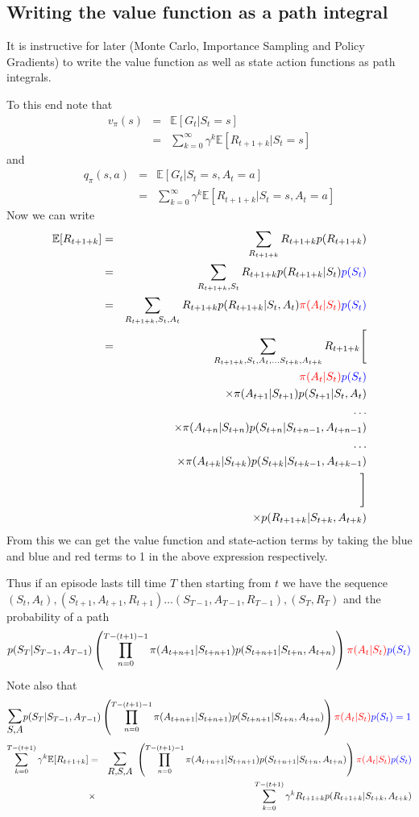 \documentclass[11pt,a4paper]{article}
\newcommand\bea{\begin{eqnarray}}
\newcommand\eea{\end{eqnarray}}
\newcommand{\nn}{\nonumber \\}
\newcommand{\e}[1]{\mathbb E[#1]}
\begin{document}
\subsection{Writing the value function as a path integral} \label{Section:PathIntegral}

It is instructive for later (Monte Carlo, Importance Sampling and Policy Gradients) to write the value function as well as state action functions as path integrals.

To this end note that
\bea
v_\pi(s) &=& \e{G_t|S_t=s} \nn
&=& \sum_{k=0}^\infty \gamma^k \e{R_{t+1+k}|S_t=s}
\eea
and
\bea
q_\pi(s,a) &=& \e{G_t|S_t=s,A_t=a} \nn
&=& \sum_{k=0}^\infty \gamma^k \e{R_{t+1+k}|S_t=s,A_t=a}
\eea
Now we can write
\bea
\e{R_{t+1+k}} &=& \sum_{R_{t+1+k}} R_{t+1+k} p(R_{t+1+k}) \nn
&=& \sum_{R_{t+1+k}, S_t} R_{t+1+k} p(R_{t+1+k}| S_t) \color{blue}{p(S_t)} \nn
&=&  \sum_{R_{t+1+k}, S_t,A_t} R_{t+1+k} p(R_{t+1+k}| S_t,A_t) \color{red}{\pi(A_t|S_t)} \color{blue}{p(S_t)}  \nn
&=& \sum_{R_{t+1+k}, S_t,A_t, \dots S_{t+k}, A_{t+k}} R_{t+1+k} \Bigg[ \nn
&& \qquad \color{red}{\pi(A_t|S_t)} \color{blue}{p(S_t)} \nn
&& \qquad \times \pi(A_{t+1}|S_{t+1}) p(S_{t+1}|S_t,A_t) \nn
&& \dots \nn
&&  \qquad \times \pi(A_{t+n}|S_{t+n}) p(S_{t+n}|S_{t+n-1},A_{t+n-1}) \nn
&& \dots \nn
&&  \qquad \times \pi(A_{t+k}|S_{t+k}) p(S_{t+k}|S_{t+k-1},A_{t+k-1}) \nn
&& \Bigg]  \nn
&& \times p(R_{t+1+k}| S_{t+k},A_{t+k})
\eea
From this we can get the value function and state-action terms by taking the {\color{blue} blue} and {\color{blue}blue} and {\color{red}red} terms to 1 in the above expression respectively.


Thus if an episode lasts till time $T$ then starting from $t$ we have the sequence \nn$(S_t,A_t),(S_{t+1}, A_{t+1}, R_{t+1}) \dots (S_{T-1}, A_{T-1},R_{T-1}), (S_T,R_T)$
and
the probability of a path
\bea
p(S_T| S_{T-1},A_{T-1}) \left( \prod_{n=0}^{T-(t+1)-1} \pi(A_{t+n+1} | S_{t+n+1} ) p( S_{t+n+1} | S_{t+n}, A_{t+n}) \right) \color{red}{\pi(A_t|S_t)} \color{blue}{p(S_t)} \nn
\eea
Note also that 
\bea
\mathlarger {\mathlarger {\sum_{S,A}}} p(S_T| S_{T-1},A_{T-1}) \left( \prod_{n=0}^{T-(t+1)-1} \pi(A_{t+n+1} | S_{t+n+1} ) p( S_{t+n+1} | S_{t+n}, A_{t+n}) \right) \color{red}{\pi(A_t|S_t)} \color{blue}{p(S_t)} =1
\eea
\bea
\sum_{k=0}^{T-(t+1)} \gamma^k \mathbb E[R_{t+1+k}] &=& \mathlarger {\mathlarger {\sum_{R,S,A}}}~  \left( \prod_{n=0}^{T-(t+1)-1} \pi(A_{t+n+1} | S_{t+n+1} ) p( S_{t+n+1} | S_{t+n}, A_{t+n}) \right) \color{red}{\pi(A_t|S_t)} \color{blue}{p(S_t)} \nn
&\times& \sum_{k=0}^{T-(t+1)} \gamma^k R_{t+1+k} p(R_{t+1+k} | S_{t+k},A_{t+k})
\eea
\end{document}
